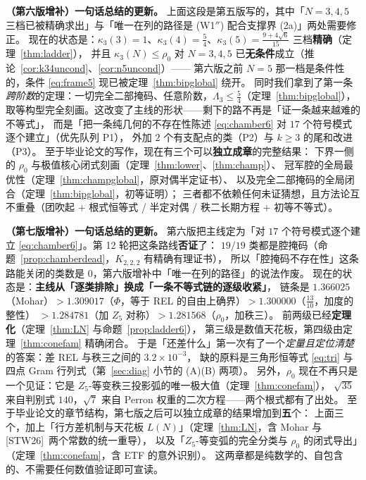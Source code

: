 \documentclass[UTF8,11pt]{ctexart}
\theoremstyle{definition}
\newcommand{\Lam}{\Lambda}
\newcommand{\STW}{\textup{[STW26]}}
\begin{document}
\medskip
\noindent\textbf{（第六版增补）一句话总结的更新。}
上面这段是第五版写的，其中「$N=3,4,5$ 三档已被精确求出」与「唯一在列的路径是 (W1$''$) 配合支撑界 (2a)」两处需要修正。
现在的状态是：$\kappa_3(3)=1$、$\kappa_3(4)=\frac54$、$\kappa_3(5)=\frac{9+4\sqrt6}{15}$ 三档\textbf{精确}（定理~\ref{thm:ladder}），
并且 $\kappa_3(N)\le\rho_0$ 对 $N=3,4,5$ 已\textbf{无条件}成立（推论~\ref{cor:k34uncond}、\ref{cor:n5uncond}）——
第六版之前 $N=5$ 那一档是条件性的，条件 \eqref{eq:frame5} 现已被定理~\ref{thm:bipglobal} 绕开。
同时我们拿到了第一条\emph{跨阶数}的定理：一切完全二部掩码、任意阶数，$\Lam_3\le\frac54$（定理~\ref{thm:bipglobal}），
取等构型完全刻画。这改变了主线的形状——剩下的路不再是「证一条越来越难的不等式」，
而是「把一条纯几何的不存在性陈述 \eqref{eq:chamber6} 对 $17$ 个符号模式逐个建立」（优先队列 P1），
外加 $2$ 个有支配点的类（P2）与 $k\ge3$ 的尾和改进（P3）。
至于毕业论文的写作，现在有三个可以\textbf{独立成章}的完整结果：
下界一侧的 $\rho_0$ 与极值核心闭式刻画（定理~\ref{thm:lower}、\ref{thm:champ}）、
冠军腔的全局最优性（定理~\ref{thm:champglobal}，原对偶半定证书）、
以及完全二部掩码的全局闭合（定理~\ref{thm:bipglobal}，初等证明）；
三者都不依赖任何未证猜想，且方法论互不重叠（团吹起 $+$ 根式恒等式 / 半定对偶 / 秩二长期方程 $+$ 初等不等式）。

\medskip
\noindent\textbf{（第七版增补）一句话总结的更新。}
第六版把主线定为「对 $17$ 个符号模式逐个建立 \eqref{eq:chamber6}」。第 12 轮把这条路线\textbf{否证}了：
$19/19$ 类都是腔掩码（命题~\ref{prop:chamberdead}，$K_{2,2,2}$ 有精确有理证书），
所以「腔掩码不存在性」这条路能关闭的类数是 $0$，第六版增补中「唯一在列的路径」的说法作废。
现在的状态是：\textbf{主线从「逐类排除」换成「一条不等式链的逐级收紧」}，
链条是 $1.366025$（Mohar）$>1.309017$（$\Phi$，等于 REL 的自由上确界）$>1.300000$（$\frac{13}{10}$，加度的整性）
$>1.284781$（加 $Z_5$ 对称）$>1.281568$（$\rho_0$，加秩三）。
前两级已经\textbf{定理化}（定理~\ref{thm:LN} 与命题~\ref{prop:ladder6}），
第三级是数值天花板，第四级由定理~\ref{thm:conefam} 精确闭合。
于是「还差什么」第一次有了一个\emph{定量且定位清楚}的答案：差 REL 与秩三之间的 $3.2\times10^{-3}$，
缺的原料是三角形恒等式 \eqref{eq:tri} 与四点 Gram 行列式（第~\ref{sec:diag} 小节的 (A)(B) 两项）。
另外，$\rho_0$ 现在不再只是一个见证：它是 $Z_5$-等变秩三投影弧的唯一极大值（定理~\ref{thm:conefam}），
$\sqrt{35}$ 来自判别式 $140$，$\sqrt7$ 来自 Perron 权重的二次方程——两个根式都有了出处。
至于毕业论文的章节结构，第七版之后可以独立成章的结果增加到\textbf{五}个：
上面三个，加上「行方差机制与天花板 $L(N)$」（定理~\ref{thm:LN}，含 Mohar 与 \STW\ 两个常数的统一重导），
以及「$Z_5$-等变弧的完全分类与 $\rho_0$ 的闭式导出」（定理~\ref{thm:conefam}，含 ETF 的意外识别）。
这两章都是纯数学的、自包含的、不需要任何数值验证即可宣读。
\end{document}

